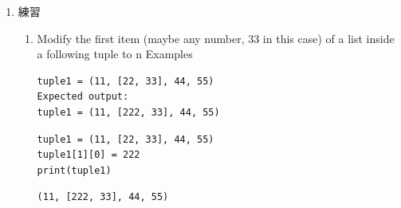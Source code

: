\documentclass[a4paper,12pt]{article}
\begin{document}
\begin{enumerate}
\begin{enumerate}
\begin{verbatim}
('r', 'o', 'g')
('p', 'r')
('i', 'z')
('p', 'r', 'o', 'g', 'r', 'a', 'm', 'i', 'z')
\end{verbatim}

\item Tuple Methods
\label{sec:org9eab3c6}
Methods that add items or remove items are not available with tuple. Only the following two methods are available.\\
\lstset{breaklines=true,language=Python,label= ,caption= ,captionpos=b,firstnumber=1,numbers=left}
\begin{lstlisting}
my_tuple = ('a', 'p', 'p', 'l', 'e',)

print(my_tuple.count('p'))  # Output: 2
print(my_tuple.index('l'))  # Output: 3
\end{lstlisting}

\begin{verbatim}
2
3
\end{verbatim}

\item Tuple遍歷
\label{sec:org4c68f98}
\lstset{breaklines=true,language=Python,label= ,caption= ,captionpos=b,firstnumber=1,numbers=left}
\begin{lstlisting}
# Using a for loop to iterate through a tuple
for name in ('John', 'Kate'):
    print("Hello", name)
\end{lstlisting}

\begin{verbatim}
Hello John
Hello Kate
\end{verbatim}
\end{enumerate}

\item 練習
\label{sec:org09b8e72}
\begin{enumerate}
\item Modify the first item (maybe any number, 33 in this case) of a list inside a following tuple to n
\label{sec:org32752d4}
Examples\\
\begin{verbatim}
tuple1 = (11, [22, 33], 44, 55)
Expected output:
tuple1 = (11, [222, 33], 44, 55)
\end{verbatim}
\lstset{breaklines=true,language=Python,label= ,caption= ,captionpos=b,firstnumber=1,numbers=left}
\begin{lstlisting}
tuple1 = (11, [22, 33], 44, 55)
tuple1[1][0] = 222
print(tuple1)
\end{lstlisting}

\begin{verbatim}
(11, [222, 33], 44, 55)
\end{verbatim}


\end{enumerate}
\end{enumerate}
\end{document}
